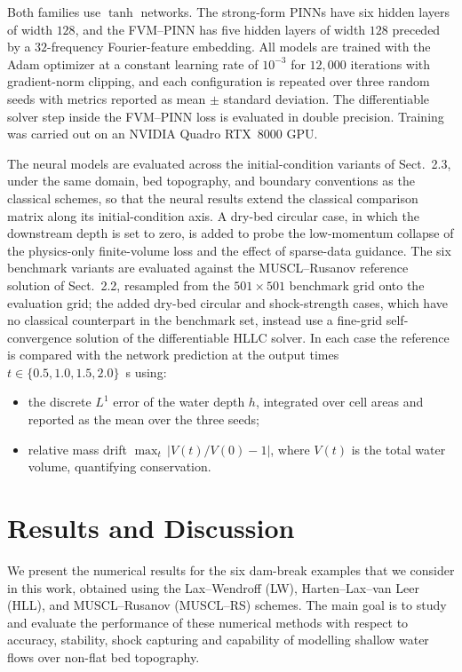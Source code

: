 \documentclass[12pt]{article}
\newenvironment{newtext}{\par\color{red}}{\par}
\begin{document}
\begin{newtext}
Both families use $\tanh$ networks. The strong-form PINNs have six hidden layers of width $128$, and the FVM--PINN has five hidden layers of width $128$ preceded by a $32$-frequency Fourier-feature embedding. All models are trained with the Adam optimizer at a constant learning rate of $10^{-3}$ for $12{,}000$ iterations with gradient-norm clipping, and each configuration is repeated over three random seeds with metrics reported as mean $\pm$ standard deviation. The differentiable solver step inside the FVM--PINN loss is evaluated in double precision. Training was carried out on an NVIDIA Quadro RTX~8000 GPU.

The neural models are evaluated across the initial-condition variants of Sect.~2.3, under the same domain, bed topography, and boundary conventions as the classical schemes, so that the neural results extend the classical comparison matrix along its initial-condition axis. A dry-bed circular case, in which the downstream depth is set to zero, is added to probe the low-momentum collapse of the physics-only finite-volume loss and the effect of sparse-data guidance. The six benchmark variants are evaluated against the MUSCL--Rusanov reference solution of Sect.~2.2, resampled from the $501\times501$ benchmark grid onto the evaluation grid; the added dry-bed circular and shock-strength cases, which have no classical counterpart in the benchmark set, instead use a fine-grid self-convergence solution of the differentiable HLLC solver. In each case the reference is compared with the network prediction at the output times $t\in\{0.5, 1.0, 1.5, 2.0\}$~s using:
\begin{itemize}
  \item the discrete $L^1$ error of the water depth $h$, integrated over cell areas and reported as the mean over the three seeds;
  \item relative mass drift $\max_t\,\lvert V(t)/V(0)-1\rvert$, where $V(t)$ is the total water volume, quantifying conservation.
\end{itemize}
\end{newtext}

\section{Results and Discussion}

We present the numerical results for the six dam-break examples that we consider in this work, obtained using the Lax--Wendroff (LW), Harten--Lax--van Leer (HLL), and MUSCL--Rusanov (MUSCL--RS) schemes. The main goal is to study and evaluate the performance of these numerical methods with respect to accuracy, stability, shock capturing and capability of modelling shallow water flows over non-flat bed topography.
\end{document}
